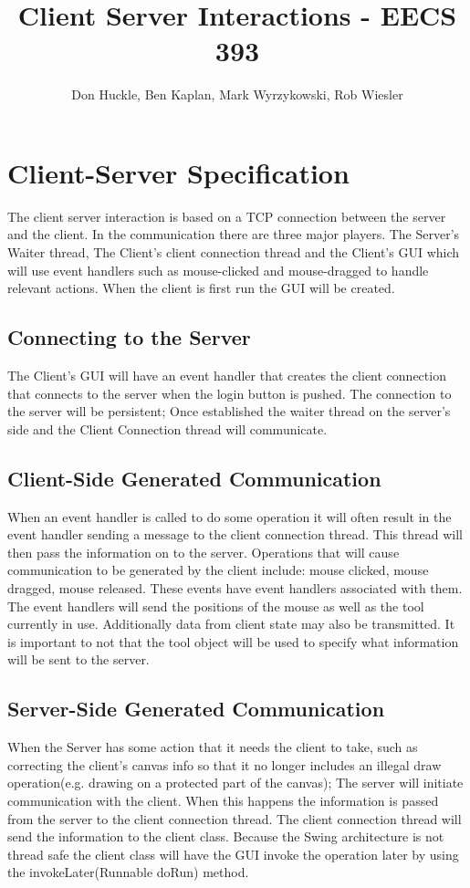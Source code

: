 \documentclass[11pt,oneside,a4paper]{article}
\title{Client Server Interactions - EECS 393}
\author{Don Huckle, Ben Kaplan, Mark Wyrzykowski, Rob Wiesler}
\begin{document}
\maketitle
\section{Client-Server Specification}
The client server interaction is based on a TCP connection between the server and the client.  
In the communication there are three major players.  
The Server's Waiter thread, The Client's client connection thread and the Client's GUI which will use event handlers such as mouse-clicked and mouse-dragged to handle relevant actions.  When the client is first run the GUI will be created.  


\subsection{Connecting to the Server}
The Client's GUI will have an event handler that creates the client connection that connects to the server when the login button is pushed. The connection to the server will be persistent;  Once established the waiter thread on the server's side and the Client Connection thread will communicate.  


\subsection{Client-Side Generated Communication}
When an event handler is called to do some operation it will often result in the event handler sending a message to the client connection thread. This thread will then pass the information on to the server. 
Operations that will cause communication to be generated by the client include: 
mouse clicked, mouse dragged, mouse released.  These events have event handlers associated with them.  The event handlers will send the positions of the mouse as well as the tool currently in use. Additionally data from client state may also be transmitted.  It is important to not that the tool object will be used to specify what information will be sent to the server.


\subsection{Server-Side Generated Communication}
When the Server has some action that it needs the client to take, such as correcting the client's canvas info so that it no longer includes an illegal draw operation(e.g. drawing on a protected part of the canvas); The server will initiate communication with the client.  When this happens the information is passed from the server to the client connection thread.  The client connection thread will send the information to the client class.  Because the Swing architecture is not thread safe the client class will have the GUI invoke the operation later by using the invokeLater(Runnable doRun) method.
\end{document}
